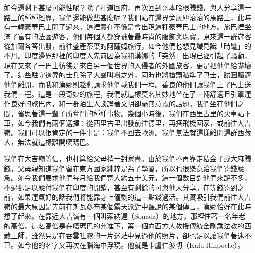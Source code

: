 如今還剩下甚麼可能性呢？除了打道回府，再次回到哥本哈根賺錢，與人分享這一路上的種種經歷，我們還能做些甚麼呢？我們站在邊界旁灰塵滾滾的馬路上，此時有一輛豪華巴士開了過來。這裡實在不像是會出現這種豪華巴士的地方。旅巴裡坐滿了富有的法國遊客，他們每個人都穿戴著最時尚的服飾與珠寶。原來這一群遊客從加爾各答出發，前往盛產茶葉的阿薩姆旅行，如今他們也想見識見識「時髦」的不丹。印度邊界那裡的印度人先前因為我和漢娜的「突然」出現已經引起了騷動，現在又來了一巴士彷彿是來自另一個世界的入侵者的外國旅客，更是把他們給嚇壞了。這些駐守邊界的士兵除了大聲叫囂之外，同時也將槍頭瞄準了巴士，試圖驅逐他們離開，而我和漢娜則趁亂請求他們載我們一程。善良的他們讓我們上了巴士送我們一程。這是一段奇妙的旅程，我們就這樣莫名其妙地坐在了一輛舒適且引擎運作良好的旅巴內，和一群陌生人談論著文明卻毫無意義的話題。我們坐在他們之間，省思著這一輩子所奮鬥的種種事物。幾個小時後，我們在西里古里的火車站下車，如今我們有兩個選擇：從西里古里出發前往德里，再搭飛機回家，或前往大吉嶺。我們可以很肯定的一件事是：我們不回去歐洲。我們無法就這樣離開這群西藏人，無法就這樣離開噶瑪巴。

我們在大吉嶺等信，也打算給父母捎一封家書。由於我們不再靠走私金子或大麻賺錢，父母親知道我們留在東方國家純粹是為了學習，所以也很樂意給我們寄錢應急。如今我們要求他們每月給我們寄大約五十美元，這一個數目對他們來說不多，不過卻足以應付我們在印度的開銷，甚至有剩餘的可與他人分享。在等錢寄到之前，如果運氣好的話我們將能靠身上僅剩的這一點錢過活。其實吸引我們前往大吉嶺的最大原因是先前在斯瓦彥布某個露天派對中聽說的某個傳言，漢娜恰好在此時想了起來。在靠近大吉嶺有一個叫索納達（Sonada）的地方，那裡住著一名年老的高僧。這名高僧是在噶瑪巴的允准下，第一個向西方人教授傳統金剛乘法教的西藏上師。雖然只是在吞雲吐霧的一片迷茫中見過他的照片，卻也足以讓我們著迷不已。如今他的名字又再次在腦海中浮現。他就是卡盧仁波切（Kalu
Rinpoche）。

